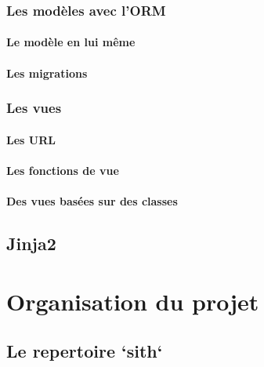 \documentclass[a4paper]{report}
\begin{document}
\subsection{Les modèles avec l'ORM}
\label{sub:les_modèles_avec_l_orm}

\subsubsection{Le modèle en lui même}
\label{ssub:Le modèle en lui même}

\subsubsection{Les migrations}
\label{ssub:Les migrations}


\subsection{Les vues}
\label{sub:les_vues}

\subsubsection{Les URL}
\label{ssub:Les URL}

\subsubsection{Les fonctions de vue}
\label{ssub:Les fonctions de vue}

\subsubsection{Des vues basées sur des classes}
\label{ssub:Des vues basées sur des classes}

\section{Jinja2}
\label{sec:jinja2}



\chapter{Organisation du projet}
\label{cha:organisation_du_projet}

\section{Le repertoire `sith`}
\label{sec:le_repertoire_sith}
\end{document}
